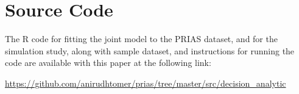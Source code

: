 \section{Source Code}
The R code for fitting the joint model to the PRIAS dataset, and for the simulation study, along with sample dataset, and instructions for running the code are available with this paper at the following link:

\url{https://github.com/anirudhtomer/prias/tree/master/src/decision_analytic}

